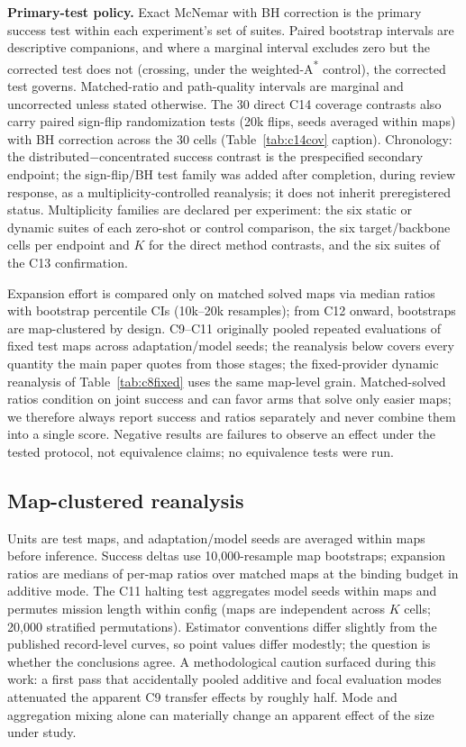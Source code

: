\documentclass[letterpaper]{article} %
\newcommand{\stage}[1]{\textsc{#1}}
\begin{document}
\textbf{Primary-test policy.} Exact McNemar with BH correction is the primary success test within each experiment's set of suites. Paired bootstrap intervals are descriptive companions, and where a marginal interval excludes zero but the corrected test does not (crossing, under the weighted-A\textsuperscript{*} control), the corrected test governs. Matched-ratio and path-quality intervals are marginal and uncorrected unless stated otherwise. The 30 direct \stage{C14} coverage contrasts also carry paired sign-flip randomization tests (20k flips, seeds averaged within maps) with BH correction across the 30 cells (Table~\ref{tab:c14cov} caption). Chronology: the distributed$-$concentrated success contrast is the prespecified secondary endpoint; the sign-flip/BH test family was added after completion, during review response, as a multiplicity-controlled reanalysis; it does not inherit preregistered status. Multiplicity families are declared per experiment: the six static or dynamic suites of each zero-shot or control comparison, the six target/backbone cells per endpoint and $K$ for the direct method contrasts, and the six suites of the \stage{C13} confirmation.

Expansion effort is compared only on matched solved maps via median ratios with bootstrap percentile CIs (10k--20k resamples); from \stage{C12} onward, bootstraps are map-clustered by design. \stage{C9}--\stage{C11} originally pooled repeated evaluations of fixed test maps across adaptation/model seeds; the reanalysis below covers every quantity the main paper quotes from those stages; the fixed-provider dynamic reanalysis of Table~\ref{tab:c8fixed} uses the same map-level grain. Matched-solved ratios condition on joint success and can favor arms that solve only easier maps; we therefore always report success and ratios separately and never combine them into a single score. Negative results are failures to observe an effect under the tested protocol, not equivalence claims; no equivalence tests were run.

\subsection{Map-clustered reanalysis}

Units are test maps, and adaptation/model seeds are averaged within maps before inference. Success deltas use 10{,}000-resample map bootstraps; expansion ratios are medians of per-map ratios over matched maps at the binding budget in additive mode. The \stage{C11} halting test aggregates model seeds within maps and permutes mission length within config (maps are independent across $K$ cells; 20{,}000 stratified permutations). Estimator conventions differ slightly from the published record-level curves, so point values differ modestly; the question is whether the conclusions agree. A methodological caution surfaced during this work: a first pass that accidentally pooled additive and focal evaluation modes attenuated the apparent \stage{C9} transfer effects by roughly half. Mode and aggregation mixing alone can materially change an apparent effect of the size under study.
\end{document}
